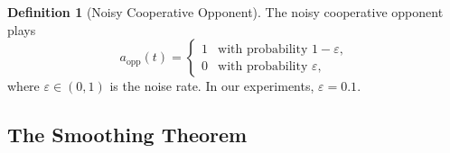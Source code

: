 \documentclass[11pt,a4paper]{article}
\theoremstyle{definition}
\newtheorem{definition}[theorem]{Definition}
\begin{document}
\begin{definition}[Noisy Cooperative Opponent]
\label{def:noisy_opponent}
The noisy cooperative opponent plays
\begin{equation}
\label{eq:noisy_opp}
a_{\mathrm{opp}}(t) =
\begin{cases}
1 & \text{with probability } 1 - \varepsilon, \\
0 & \text{with probability } \varepsilon,
\end{cases}
\end{equation}
where $\varepsilon \in (0,1)$ is the noise rate.  In our experiments,
$\varepsilon = 0.1$.
\end{definition}

\subsection{The Smoothing Theorem}
\end{document}
